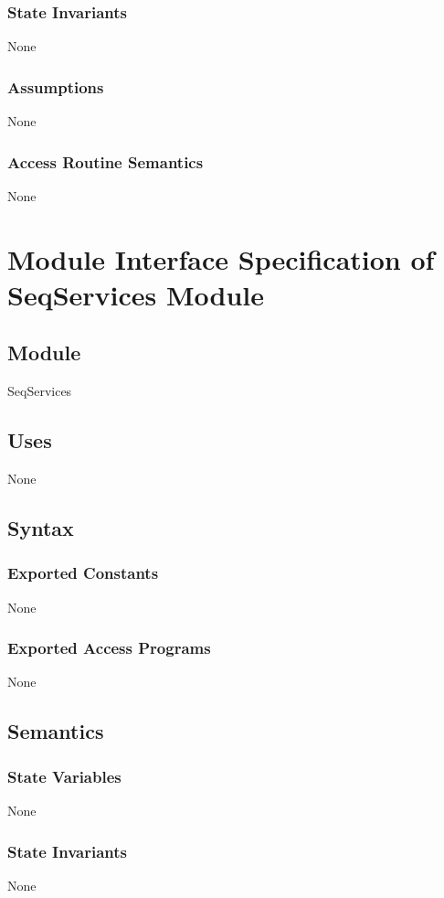 \documentclass[12pt]{article}
\begin{document}
\subsubsection{State Invariants}
\label{Sec:StateInvars}
None
\subsubsection{Assumptions}
\label{Sec:Assumps}
None
\subsubsection{Access Routine Semantics}
\label{Sec:AccRoutSemantics}
None
\section{Module Interface Specification of SeqServices Module}
\label{Sec:SeqServices}
\subsection{Module}
\label{Sec:Module}
SeqServices
\subsection{Uses}
\label{Sec:Uses}
None
\subsection{Syntax}
\label{Sec:Syntax}
\subsubsection{Exported Constants}
\label{Sec:ExpConstants}
None
\subsubsection{Exported Access Programs}
\label{Sec:ExpAccPrograms}
None
\subsection{Semantics}
\label{Sec:Semantics}
\subsubsection{State Variables}
\label{Sec:StateVars}
None
\subsubsection{State Invariants}
\label{Sec:StateInvars}
None
\end{document}
